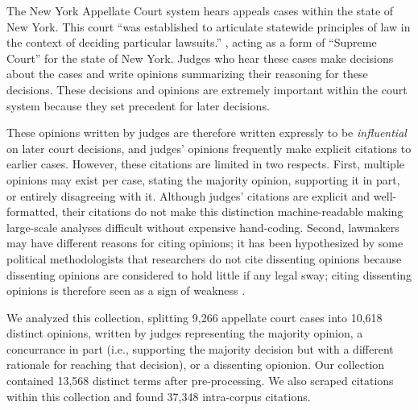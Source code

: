 The New York Appellate Court system hears appeals cases within the
state of New York.  This court ``was established to articulate
statewide principles of law in the context of deciding particular
lawsuits.''  \citep{nyca_webpage:2012}, acting as a form of ``Supreme
Court'' for the state of New York.  Judges who hear these cases make
decisions about the cases and write opinions summarizing their
reasoning for these decisions.  These decisions and opinions are
extremely important within the court system because they set precedent
for later decisions.

These opinions written by judges are therefore written expressly to be
\emph{influential} on later court decisions, and judges' opinions
frequently make explicit citations to earlier cases.  However, these
citations are limited in two respects.  First, multiple opinions may
exist per case, stating the majority opinion, supporting it in part,
or entirely disagreeing with it. Although judges' citations are
explicit and well-formatted, their citations do not make this
distinction machine-readable making large-scale analyses difficult
without expensive hand-coding. Second, lawmakers may have different
reasons for citing opinions; it has been hypothesized by some
political methodologists that researchers do not cite dissenting
opinions because dissenting opinions are considered to hold little if
any legal sway; citing dissenting opinions is therefore seen as a sign
of weakness \citep{beim:2011}.

We analyzed this collection, splitting 9,266 appellate court cases into
10,618 distinct opinions, written by judges representing the majority
opinion, a concurrance in part (i.e., supporting the majority decision
but with a different rationale for reaching that decision), or a
dissenting opionion.  Our collection contained 13,568 distinct terms
after pre-processing. We also scraped citations within this collection
and found 37,348 intra-corpus citations.


